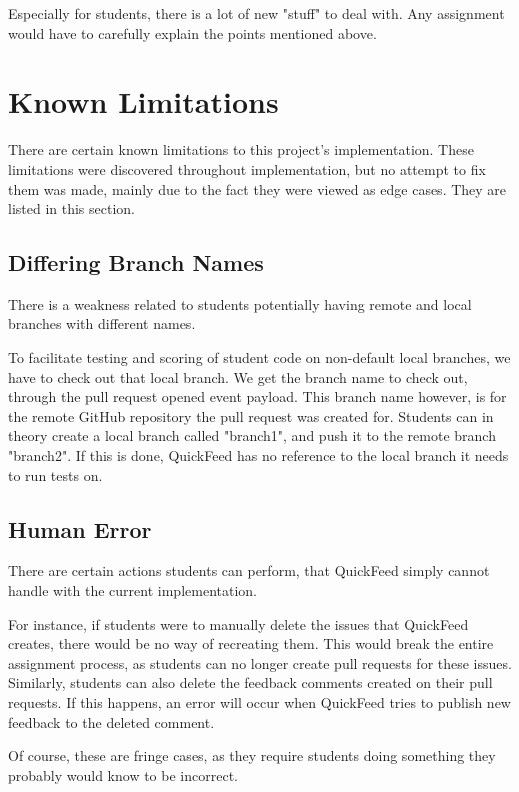Especially for students, there is a lot of new "stuff" to deal with.
Any assignment would have to carefully explain the points mentioned above.

\section{Known Limitations}

There are certain known limitations to this project's implementation.
These limitations were discovered throughout implementation, but no attempt to fix them was made, mainly due to the fact they were viewed as edge cases.
They are listed in this section.

\subsection{Differing Branch Names}

There is a weakness related to students potentially having remote and local branches with different names.

To facilitate testing and scoring of student code on non-default local branches, we have to check out that local branch.
We get the branch name to check out, through the pull request opened event payload.
This branch name however, is for the remote GitHub repository the pull request was created for.
Students can in theory create a local branch called "branch1", and push it to the remote branch "branch2".
If this is done, QuickFeed has no reference to the local branch it needs to run tests on.

\subsection{Human Error}

There are certain actions students can perform, that QuickFeed simply cannot handle with the current implementation.

For instance, if students were to manually delete the issues that QuickFeed creates, there would be no way of recreating them.
This would break the entire assignment process, as students can no longer create pull requests for these issues.
Similarly, students can also delete the feedback comments created on their pull requests.
If this happens, an error will occur when QuickFeed tries to publish new feedback to the deleted comment.

Of course, these are fringe cases, as they require students doing something they probably would know to be incorrect.

